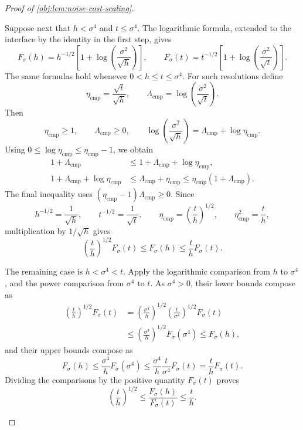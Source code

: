 \begin{proof}[Proof of \cref{obj:lem:noise-cost-scaling}]
\begin{enumerate}
Suppose next that \(h<\sigma^4\) and \(t\le\sigma^4\). The logarithmic formula, extended to the interface by the identity in the first step, gives
\[
F_\sigma(h)=h^{-1/2}
 \left[1+\log\left(\frac{\sigma^2}{\sqrt h}\right)\right],
\qquad
F_\sigma(t)=t^{-1/2}
 \left[1+\log\left(\frac{\sigma^2}{\sqrt t}\right)\right].
\]
The same formulas hold whenever \(0<h\le t\le\sigma^4\).
For such resolutions define
\[
\eta_{\mathrm{cmp}}=\frac{\sqrt t}{\sqrt h},
\qquad
\Lambda_{\mathrm{cmp}}=\log\left(\frac{\sigma^2}{\sqrt t}\right).
\]
Then
\[
\eta_{\mathrm{cmp}}\ge1,\qquad
\Lambda_{\mathrm{cmp}}\ge0,\qquad
\log\left(\frac{\sigma^2}{\sqrt h}\right)
=\Lambda_{\mathrm{cmp}}+\log\eta_{\mathrm{cmp}}.
\]
Using \(0\le\log\eta_{\mathrm{cmp}}\le\eta_{\mathrm{cmp}}-1\), we obtain
\[
\begin{aligned}
1+\Lambda_{\mathrm{cmp}}
&\le1+\Lambda_{\mathrm{cmp}}+\log\eta_{\mathrm{cmp}},\\
1+\Lambda_{\mathrm{cmp}}+\log\eta_{\mathrm{cmp}}
&\le\Lambda_{\mathrm{cmp}}+\eta_{\mathrm{cmp}}
\le\eta_{\mathrm{cmp}}(1+\Lambda_{\mathrm{cmp}}).
\end{aligned}
\]
The final inequality uses
\((\eta_{\mathrm{cmp}}-1)\Lambda_{\mathrm{cmp}}\ge0\).
Since
\[
h^{-1/2}=\frac1{\sqrt h},\qquad
t^{-1/2}=\frac1{\sqrt t},\qquad
\eta_{\mathrm{cmp}}=\left(\frac th\right)^{1/2},
\qquad
\eta_{\mathrm{cmp}}^2=\frac th,
\]
multiplication by \(1/\sqrt h\) gives
\[
\left(\frac th\right)^{1/2}F_\sigma(t)
\le F_\sigma(h)
\le\frac th F_\sigma(t).
\]

The remaining case is \(h<\sigma^4<t\). Apply the logarithmic comparison from \(h\) to \(\sigma^4\), and the power comparison from \(\sigma^4\) to \(t\). As \(\sigma^4>0\), their lower bounds compose as
\[
\begin{aligned}
\left(\frac th\right)^{1/2}F_\sigma(t)
&=\left(\frac{\sigma^4}{h}\right)^{1/2}
  \left(\frac{t}{\sigma^4}\right)^{1/2}F_\sigma(t)\\
&\le\left(\frac{\sigma^4}{h}\right)^{1/2}F_\sigma(\sigma^4)
\le F_\sigma(h),
\end{aligned}
\]
and their upper bounds compose as
\[
F_\sigma(h)
\le\frac{\sigma^4}{h}F_\sigma(\sigma^4)
\le\frac{\sigma^4}{h}\frac{t}{\sigma^4}F_\sigma(t)
=\frac th F_\sigma(t).
\]
Dividing the comparisons by the positive quantity \(F_\sigma(t)\) proves
\[
\left(\frac th\right)^{1/2}
\le\frac{F_\sigma(h)}{F_\sigma(t)}
\le\frac th.
\]


\end{enumerate}
\end{proof}

